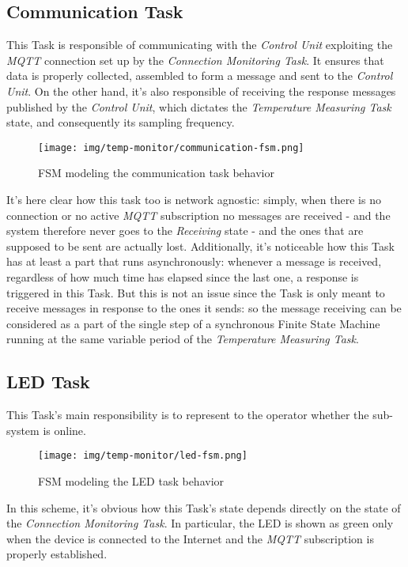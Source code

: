 \documentclass[a4paper,12pt]{report}
\begin{document}
		\subsection{Communication Task}
		This Task is responsible of communicating with the \textit{Control Unit} exploiting the \textit{MQTT} connection set up by the \textit{Connection Monitoring Task}. It ensures that data is properly collected, assembled to form a message and sent to the \textit{Control Unit}. On the other hand, it's also responsible of receiving the response messages published by the \textit{Control Unit}, which dictates the \textit{Temperature Measuring Task} state, and consequently its sampling frequency.
		\begin{figure}[H]
			\centering{}
			\texttt{[image: img/temp-monitor/communication-fsm.png]}
			\caption{FSM modeling the communication task behavior}
			\label{img:temp-monitor/communication-fsm}
		\end{figure}
		It's here clear how this task too is network agnostic: simply, when there is no connection or no active \textit{MQTT} subscription no messages are received - and the system therefore never goes to the \textit{Receiving} state - and the ones that are supposed to be sent are actually lost.
		\newline Additionally, it's noticeable how this Task has at least a part that runs asynchronously: whenever a message is received, regardless of how much time has elapsed since the last one, a response is triggered in this Task. But this is not an issue since the Task is only meant to receive messages in response to the ones it sends: so the message receiving can be considered as a part of the single step of a synchronous Finite State Machine running at the same variable period of the \textit{Temperature Measuring Task}.
		\subsection{LED Task}
		This Task's main responsibility is to represent to the operator whether the sub-system is online.
		\begin{figure}[H]
			\centering{}
			\texttt{[image: img/temp-monitor/led-fsm.png]}
			\caption{FSM modeling the LED task behavior}
			\label{img:temp-monitor/led-fsm}
		\end{figure}
		In this scheme, it's obvious how this Task's state depends directly on the state of the \textit{Connection Monitoring Task}. In particular, the LED is shown as green only when the device is connected to the Internet and the \textit{MQTT} subscription is properly established.
\end{document}
